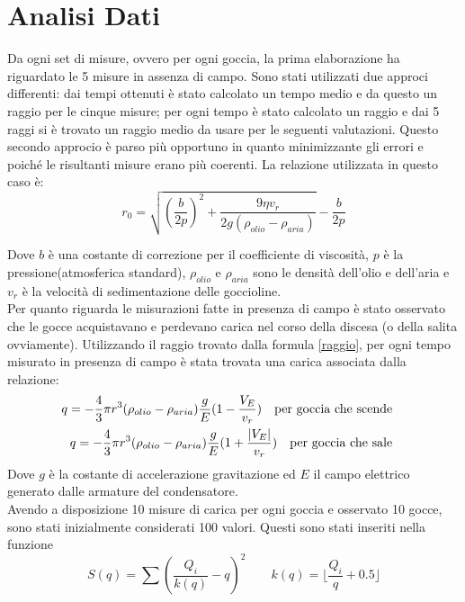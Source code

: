 \documentclass{article}
\begin{document}
   
\section{Analisi Dati}
    Da ogni set di misure, ovvero per ogni goccia, la prima elaborazione ha riguardato le 5 misure in assenza di campo. Sono stati utilizzati due approci differenti: dai tempi ottenuti è stato calcolato un tempo medio e da questo un raggio per le cinque misure; per ogni tempo è stato calcolato un raggio e dai 5 raggi si è trovato un raggio medio da usare per le seguenti valutazioni. Questo secondo approcio è parso più opportuno in quanto minimizzante gli errori e poiché le risultanti misure erano più coerenti. La relazione utilizzata in questo caso è:
    \begin{equation}\label{raggio}
        r_0 = \sqrt{(\frac{b}{2p})^2+\frac{9\eta v_r}{2g(\rho_{olio}-\rho_{aria})}}-\frac{b}{2p}
    \end{equation}

    Dove $b$ è una costante di correzione per il coefficiente di viscosità, $p$ è la pressione(atmosferica standard), $\rho_{olio}$ e $\rho_{aria}$ sono le densità dell'olio e dell'aria e $v_r$ è la velocità di sedimentazione delle goccioline.\\
    
    
    Per quanto riguarda le misurazioni fatte in presenza di campo è stato osservato che le gocce acquistavano e perdevano carica nel corso della discesa (o della salita ovviamente). Utilizzando il raggio trovato dalla formula \ref{raggio}, per ogni tempo misurato in presenza di campo è stata trovata una carica associata dalla relazione:
        \begin{align}\label{formula carica}
            q = -\frac{4}{3}\pi r^3(\rho_{olio}-\rho_{aria})\frac{g}{E}(1-\frac{V_E}{v_r}) \qq{per goccia che scende} \\
            q = -\frac{4}{3}\pi r^3(\rho_{olio}-\rho_{aria})\frac{g}{E}(1+ \frac{|V_E|}{v_r}) \qq{per goccia che sale}
        \end{align}
    Dove $g$ è la costante di accelerazione gravitazione ed $E$ il campo elettrico generato dalle armature del condensatore.\\
    
    Avendo a disposizione 10 misure di carica per ogni goccia e osservato 10 gocce, sono stati inizialmente considerati 100 valori. Questi sono stati inseriti nella funzione
        \begin{equation}\label{S(q)}
            S(q) = \sum (\frac{Q_i}{k(q)}-q)^2 \quad  \quad k(q) = \lfloor \frac{Q_i}{q} +0.5 \rfloor 
        \end{equation} 
        
\end{document}
